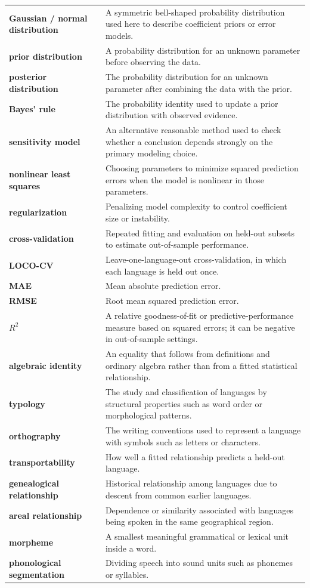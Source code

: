 \documentclass[11pt]{article}
\begin{document}
\begin{longtable}{p{}p{}}
\textbf{Gaussian / normal distribution} & A symmetric bell-shaped probability distribution used here to describe coefficient priors or error models.\\
\textbf{prior distribution} & A probability distribution for an unknown parameter before observing the data.\\
\textbf{posterior distribution} & The probability distribution for an unknown parameter after combining the data with the prior.\\
\textbf{Bayes' rule} & The probability identity used to update a prior distribution with observed evidence.\\
\textbf{sensitivity model} & An alternative reasonable method used to check whether a conclusion depends strongly on the primary modeling choice.\\
\textbf{nonlinear least squares} & Choosing parameters to minimize squared prediction errors when the model is nonlinear in those parameters.\\
\textbf{regularization} & Penalizing model complexity to control coefficient size or instability.\\
\textbf{cross-validation} & Repeated fitting and evaluation on held-out subsets to estimate out-of-sample performance.\\
\textbf{LOCO-CV} & Leave-one-language-out cross-validation, in which each language is held out once.\\
\textbf{MAE} & Mean absolute prediction error.\\
\textbf{RMSE} & Root mean squared prediction error.\\
\textbf{$R^2$} & A relative goodness-of-fit or predictive-performance measure based on squared errors; it can be negative in out-of-sample settings.\\
\textbf{algebraic identity} & An equality that follows from definitions and ordinary algebra rather than from a fitted statistical relationship.\\
\textbf{typology} & The study and classification of languages by structural properties such as word order or morphological patterns.\\
\textbf{orthography} & The writing conventions used to represent a language with symbols such as letters or characters.\\
\textbf{transportability} & How well a fitted relationship predicts a held-out language.\\
\textbf{genealogical relationship} & Historical relationship among languages due to descent from common earlier languages.\\
\textbf{areal relationship} & Dependence or similarity associated with languages being spoken in the same geographical region.\\
\textbf{morpheme} & A smallest meaningful grammatical or lexical unit inside a word.\\
\textbf{phonological segmentation} & Dividing speech into sound units such as phonemes or syllables.\\


\end{longtable}
\end{document}
